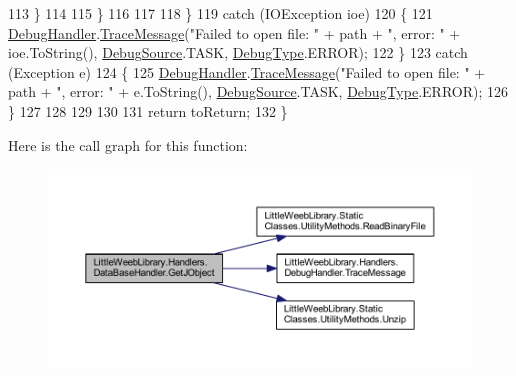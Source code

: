 \begin{DoxyCode}
113                     \}                   
114                     
115                 \}
116 
117                 
118             \}
119             \textcolor{keywordflow}{catch} (IOException ioe)
120             \{
121                 \mbox{\hyperlink{class_little_weeb_library_1_1_handlers_1_1_data_base_handler_aa474a1f934032623ffb3ae5eb156148b}{DebugHandler}}.\mbox{\hyperlink{interface_little_weeb_library_1_1_handlers_1_1_i_debug_handler_a2e405bc3492e683cd3702fae125221bc}{TraceMessage}}(\textcolor{stringliteral}{"Failed to open file: "} + path + \textcolor{stringliteral}{",
       error: "} + ioe.ToString(), \mbox{\hyperlink{namespace_little_weeb_library_1_1_handlers_a2a6ca0775121c9c503d58aa254d292be}{DebugSource}}.TASK, \mbox{\hyperlink{namespace_little_weeb_library_1_1_handlers_ab66019ed40462876ec4e61bb3ccb0a62}{DebugType}}.ERROR);
122             \}
123             \textcolor{keywordflow}{catch} (Exception e)
124             \{
125                 \mbox{\hyperlink{class_little_weeb_library_1_1_handlers_1_1_data_base_handler_aa474a1f934032623ffb3ae5eb156148b}{DebugHandler}}.\mbox{\hyperlink{interface_little_weeb_library_1_1_handlers_1_1_i_debug_handler_a2e405bc3492e683cd3702fae125221bc}{TraceMessage}}(\textcolor{stringliteral}{"Failed to open file: "} + path + \textcolor{stringliteral}{",
       error: "} + e.ToString(), \mbox{\hyperlink{namespace_little_weeb_library_1_1_handlers_a2a6ca0775121c9c503d58aa254d292be}{DebugSource}}.TASK, \mbox{\hyperlink{namespace_little_weeb_library_1_1_handlers_ab66019ed40462876ec4e61bb3ccb0a62}{DebugType}}.ERROR);
126             \}
127 
128 
129             
130 
131             \textcolor{keywordflow}{return} toReturn;
132         \}
\end{DoxyCode}
Here is the call graph for this function\+:\nopagebreak
\begin{figure}[H]
\begin{center}
\leavevmode
\includegraphics[width=350pt]{class_little_weeb_library_1_1_handlers_1_1_data_base_handler_a7f61583807f99b7838a33d2db0f7ca68_cgraph}
\end{center}
\end{figure}
